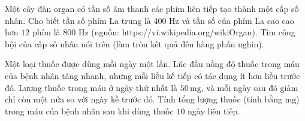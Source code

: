 \begin{bt}[TH] %
	Một cây đàn organ có tần số âm thanh các phím liên tiếp tạo thành một cấp số nhân. Cho biết tần số phím La trung là $400$ Hz và tần số của phím La cao cao hơn $12$ phím là $800$ Hz (nguồn: https://vi.wikipedia.org/wikiOrgan). Tìm công bội của cấp số nhân nói trên (làm tròn kết quả đến hàng phần nghìn).
\end{bt}


\begin{bt}[VD]%
	Một loại thuốc được dùng mỗi ngày một lần. Lúc đầu nồng độ thuốc trong máu của bệnh nhân tăng nhanh, nhưng mỗi liều kế tiếp có tác dụng ít hơn liều trước đó. Lượng thuốc trong máu ở ngày thứ nhất là $50 \,\mathrm{mg}$, và mỗi ngày sau đó giảm chỉ còn một nửa so với ngày kề trước đó. Tính tổng lượng thuốc (tính bằng $\mathrm{mg}$) trong máu của bệnh nhân sau khi dùng thuốc $10$ ngày liên tiếp.
\end{bt}
